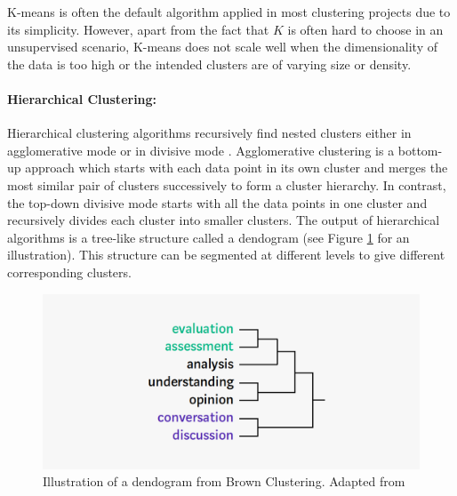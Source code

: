 K-means is often the default algorithm applied in most clustering projects due to its simplicity. However, apart from the fact that $K$ is often hard to choose in an unsupervised scenario, K-means does not scale well when the dimensionality of the data is too high or the intended clusters are of varying size or density. 




\paragraph{Hierarchical Clustering:} Hierarchical clustering algorithms recursively find nested clusters either in agglomerative mode or in divisive mode \cite{Jain2010}. Agglomerative clustering is a bottom-up approach which starts with each data point in its own cluster and merges the most similar pair of clusters successively to form a cluster hierarchy. In contrast, the top-down divisive mode starts with all the data points in one cluster and recursively divides each cluster into smaller clusters. The output of hierarchical algorithms is a tree-like structure called a dendogram (see Figure \ref{fig:brownclustering} for an illustration). This structure can be segmented at different levels to give different corresponding clusters. 

\begin{figure}[h!]
\centering
  \includegraphics[scale=0.4]{figures/BrownClustering.png}
  \caption{Illustration of a dendogram from Brown Clustering. Adapted from \cite{Brown1992}}
  \label{fig:brownclustering}
\end{figure}

